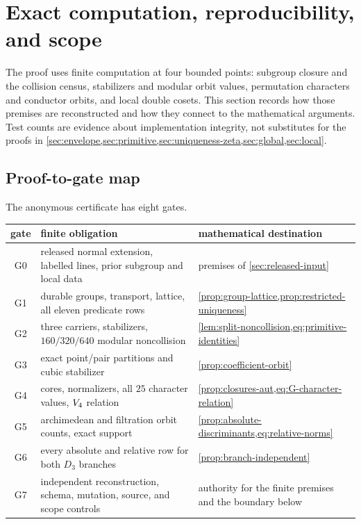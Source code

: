 \section{Exact computation, reproducibility, and scope}
\label{sec:reproducibility}

The proof uses finite computation at four bounded points: subgroup closure and
the collision census, stabilizers and modular orbit values, permutation
characters and conductor orbits, and local double cosets.  This section
records how those premises are reconstructed and how they connect to the
mathematical arguments.  Test counts are evidence about implementation
integrity, not substitutes for the proofs in
\cref{sec:envelope,sec:primitive,sec:uniqueness-zeta,sec:global,sec:local}.

\subsection{Proof-to-gate map}

The anonymous certificate has eight gates.
\begin{center}
\small
\begin{tabularx}{\textwidth}{@{}cYY@{}}
\toprule
gate & finite obligation & mathematical destination\\
\midrule
G0 & released normal extension, labelled lines, prior subgroup and local data &
premises of \cref{sec:released-input}\\
G1 & durable groups, transport, lattice, all eleven predicate rows &
\cref{prop:group-lattice,prop:restricted-uniqueness}\\
G2 & three carriers, stabilizers, $160/320/640$ modular noncollision &
\cref{lem:split-noncollision,eq:primitive-identities}\\
G3 & exact point/pair partitions and cubic stabilizer &
\cref{prop:coefficient-orbit}\\
G4 & cores, normalizers, all $25$ character values, $V_4$ relation &
\cref{prop:closures-aut,eq:G-character-relation}\\
G5 & archimedean and filtration orbit counts, exact support &
\cref{prop:absolute-discriminants,eq:relative-norms}\\
G6 & every absolute and relative row for both $D_3$ branches &
\cref{prop:branch-independent}\\
G7 & independent reconstruction, schema, mutation, source, and scope controls &
authority for the finite premises and the boundary below\\
\bottomrule
\end{tabularx}
\end{center}


